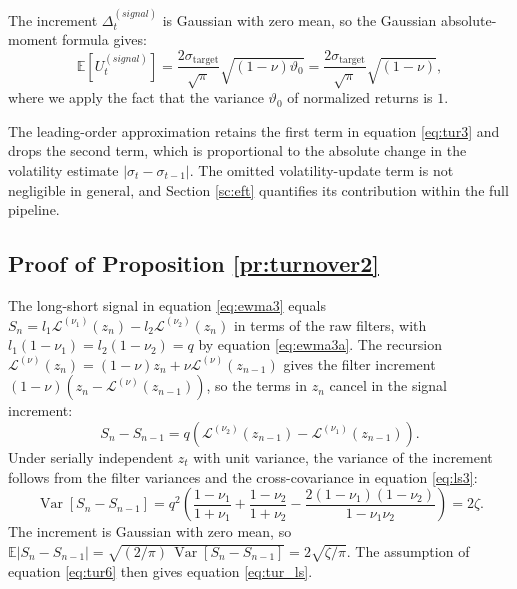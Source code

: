 \documentclass[hidelinks]{siamonline250211}
\DeclareMathOperator{\Var}{Var}
\begin{document}
The increment $\Delta^{(signal)}_{t}$ is Gaussian with zero mean, so the Gaussian absolute-moment formula gives:
\begin{equation} \label{eq:tur6}  
	\mathbb{E}\left[ U^{(signal)}_{t}  \right] = \frac{2\sigma_{\mathrm{target}}}{\sqrt{\pi}}  \sqrt{ (1-\nu) \vartheta_{0} }  =  \frac{2\sigma_{\mathrm{target}}}{\sqrt{\pi}}  \sqrt{ (1-\nu) }, 
\end{equation}
where we apply the fact that the variance $\vartheta_{0}$ of normalized returns is $1$.

The leading-order approximation retains the first term in equation \eqref{eq:tur3} and drops the second term, which is proportional to the absolute change in the volatility estimate $\left|\sigma_{t}- \sigma_{t-1}\right|$. The omitted volatility-update term is not negligible in general, and Section \ref{sc:eft} quantifies its contribution within the full pipeline.




\subsection{Proof of Proposition \ref{pr:turnover2}}\label{sec:ta2}

The long-short signal in equation \eqref{eq:ewma3} equals $S_{n} = l_{1}\mathcal{L}^{(\nu_{1})}(z_{n}) - l_{2}\mathcal{L}^{(\nu_{2})}(z_{n})$ in terms of the raw filters, with $l_{1}(1-\nu_{1}) = l_{2}(1-\nu_{2}) = q$ by equation \eqref{eq:ewma3a}. The recursion $\mathcal{L}^{(\nu)}(z_{n}) = (1-\nu)z_{n} + \nu \mathcal{L}^{(\nu)}(z_{n-1})$ gives the filter increment $(1-\nu)\left(z_{n} - \mathcal{L}^{(\nu)}(z_{n-1})\right)$, so the terms in $z_{n}$ cancel in the signal increment:
\begin{equation} \label{eq:tur_ls1}
	S_{n} - S_{n-1} = q\left( \mathcal{L}^{(\nu_{2})}(z_{n-1}) - \mathcal{L}^{(\nu_{1})}(z_{n-1}) \right).
\end{equation}
Under serially independent $z_{t}$ with unit variance, the variance of the increment follows from the filter variances and the cross-covariance in equation \eqref{eq:ls3}:
\begin{equation} \label{eq:tur_ls2}
	\Var\left[ S_{n} - S_{n-1} \right] = q^{2}\left( \frac{1-\nu_{1}}{1+\nu_{1}}  +  \frac{1-\nu_{2}}{1+\nu_{2}}  - \frac{2\left( 1-\nu_{1}\right) \left( 1-\nu_{2}\right)}{1-\nu_{1}\nu_{2}}\right) = 2\zeta.
\end{equation}
The increment is Gaussian with zero mean, so $\mathbb{E}\left|S_{n} - S_{n-1}\right| = \sqrt{(2/\pi)\, \Var\left[ S_{n} - S_{n-1} \right]} = 2\sqrt{\zeta/\pi}$. The assumption of equation \eqref{eq:tur6} then gives equation \eqref{eq:tur_ls}.
\end{document}

